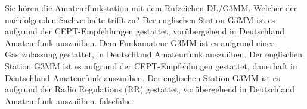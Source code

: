     {Sie hören die Amateurfunkstation mit dem Rufzeichen DL/G3MM. Welcher der nachfolgenden Sachverhalte trifft zu?}
    {Der englischen Station G3MM ist es aufgrund der CEPT-Empfehlungen gestattet, vorübergehend in Deutschland Amateurfunk auszuüben.}
    {Dem Funkamateur G3MM ist es aufgrund einer Gastzulassung gestattet, in Deutschland Amateurfunk auszuüben.}
    {Der englischen Station G3MM ist es aufgrund der CEPT-Empfehlungen gestattet, dauerhaft in Deutschland Amateurfunk auszuüben.}
    {Der englischen Station G3MM ist es aufgrund der Radio Regulations (RR) gestattet, vorübergehend in Deutschland Amateurfunk auszuüben.}
    {false}{false}